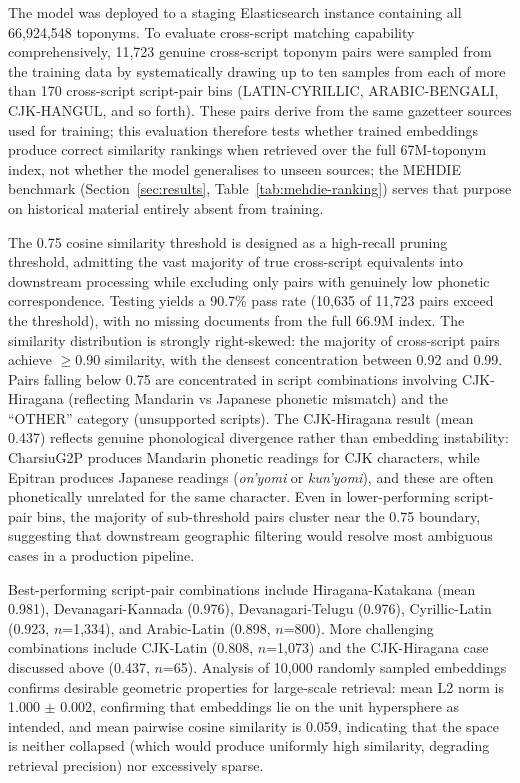 \documentclass[11pt,a4paper]{article}
\begin{document}
The model was deployed to a staging Elasticsearch instance containing all 66,924,548 toponyms. To evaluate cross-script matching capability comprehensively, 11,723 genuine cross-script toponym pairs were sampled from the training data by systematically drawing up to ten samples from each of more than 170 cross-script script-pair bins (LATIN-CYRILLIC, ARABIC-BENGALI, CJK-HANGUL, and so forth). These pairs derive from the same gazetteer sources used for training; this evaluation therefore tests whether trained embeddings produce correct similarity rankings when retrieved over the full 67M-toponym index, not whether the model generalises to unseen sources; the MEHDIE benchmark (Section~\ref{sec:results}, Table~\ref{tab:mehdie-ranking}) serves that purpose on historical material entirely absent from training.

The 0.75 cosine similarity threshold is designed as a high-recall pruning threshold, admitting the vast majority of true cross-script equivalents into downstream processing while excluding only pairs with genuinely low phonetic correspondence. Testing yields a 90.7\% pass rate (10,635 of 11,723 pairs exceed the threshold), with no missing documents from the full 66.9M index. The similarity distribution is strongly right-skewed: the majority of cross-script pairs achieve $\geq$0.90 similarity, with the densest concentration between 0.92 and 0.99. Pairs falling below 0.75 are concentrated in script combinations involving CJK-Hiragana (reflecting Mandarin vs Japanese phonetic mismatch) and the ``OTHER'' category (unsupported scripts). The CJK-Hiragana result (mean 0.437) reflects genuine phonological divergence rather than embedding instability: CharsiuG2P produces Mandarin phonetic readings for CJK characters, while Epitran produces Japanese readings (\emph{on'yomi} or \emph{kun'yomi}), and these are often phonetically unrelated for the same character. Even in lower-performing script-pair bins, the majority of sub-threshold pairs cluster near the 0.75 boundary, suggesting that downstream geographic filtering would resolve most ambiguous cases in a production pipeline.

Best-performing script-pair combinations include Hiragana-Katakana (mean 0.981), Devanagari-Kannada (0.976), Devanagari-Telugu (0.976), Cyrillic-Latin (0.923, $n$=1,334), and Arabic-Latin (0.898, $n$=800). More challenging combinations include CJK-Latin (0.808, $n$=1,073) and the CJK-Hiragana case discussed above (0.437, $n$=65). Analysis of 10,000 randomly sampled embeddings confirms desirable geometric properties for large-scale retrieval: mean L2 norm is 1.000 $\pm$ 0.002, confirming that embeddings lie on the unit hypersphere as intended, and mean pairwise cosine similarity is 0.059, indicating that the space is neither collapsed (which would produce uniformly high similarity, degrading retrieval precision) nor excessively sparse.
\end{document}
